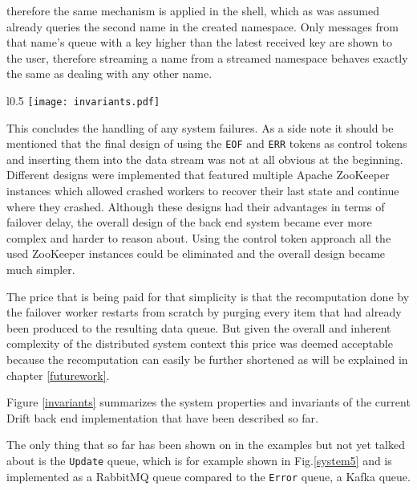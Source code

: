 therefore the same mechanism is applied in the shell, which as was
assumed already queries the second name in the created namespace.
Only messages from that name's queue with a key higher than the
latest received key are shown to the user, therefore streaming a name
from a streamed namespace behaves exactly the same as dealing with
any other name.

\begin{wrapfigure}{l}{0.5\textwidth}
  \texttt{[image: invariants.pdf]}
  \caption{Table summarizing the properties and invariants of
           the Drift system implementation.}
  \label{invariants}
\end{wrapfigure}

This concludes the handling of any system failures. As a side note
it should be mentioned that the final design of using the
\texttt{EOF} and \texttt{ERR} tokens as control tokens and inserting
them into the data stream was not at all obvious at the beginning.
Different designs were implemented that featured multiple Apache
ZooKeeper instances which allowed crashed workers to recover their
last state and continue where they crashed. Although these designs had
their advantages in terms of failover delay, the overall design
of the back end system became ever more complex and harder to
reason about. Using the control token approach all the used
ZooKeeper instances could be eliminated and the overall design
became much simpler.

The price that is being paid for that simplicity is that the
recomputation done by the failover worker restarts from scratch
by purging every item that had already been produced to the
resulting data queue. But given the overall and inherent complexity
of the distributed system context this price was deemed acceptable
because the recomputation can easily be further shortened as will
be explained in chapter \ref{futurework}.

Figure \ref{invariants} summarizes the system properties and
invariants of the current Drift back end implementation
that have been described so far.
\newline

The only thing that so far has been shown on in the examples
but not yet talked about is the \texttt{Update} queue, which
is for example shown in Fig.\ref{system5} and is implemented
as a RabbitMQ queue compared to the \texttt{Error} queue, a
Kafka queue.

